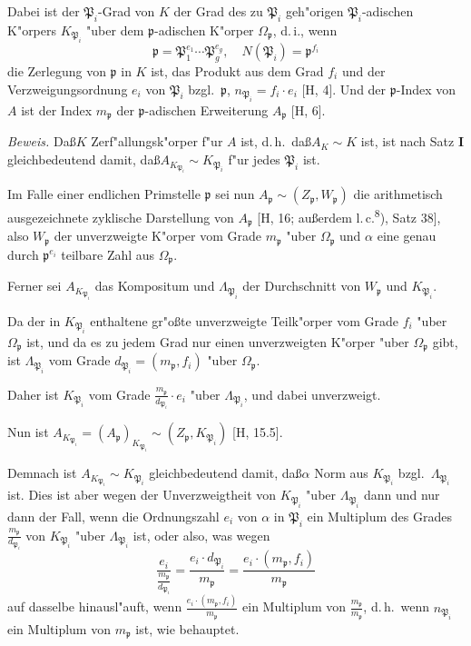 \documentclass[12pt,a4paper]{article}
\theoremstyle{plain}
\begin{document}
Dabei ist der $\mathfrak{P}_i$-Grad von $K$ der Grad des zu $\mathfrak{P}_i$ geh"origen $\mathfrak{P}_i$-adischen K"orpers $K_{\mathfrak{P}_i}$ "uber dem $\mathfrak{p}$-adischen K"orper $\Omega_\mathfrak{p}$, d.\,i., wenn
\[
\mathfrak{p} = \mathfrak{P}_1^{e_1} \cdots \mathfrak{P}_g^{e_g},\quad
N(\mathfrak{P}_i) = \mathfrak{p}^{f_i}
\]
die Zerlegung von $\mathfrak{p}$ in $K$ ist, das Produkt aus dem Grad $f_i$ und der Verzweigungsordnung $e_i$ von $\mathfrak{P}_i$ bzgl.\ $\mathfrak{p}$, $n_{\mathfrak{P}_i} = f_i \cdot e_i$ [H, 4]. Und der $\mathfrak{p}$-Index von $A$ ist der Index $m_\mathfrak{p}$ der $\mathfrak{p}$-adischen Erweiterung $A_\mathfrak{p}$ [H, 6].

\noindent\textit{Beweis.}
Da\ss $K$ Zerf"allungsk"orper f"ur $A$ ist, d.\,h.\ da\ss $A_K \sim K$ ist, ist nach Satz \textbf{I} gleichbedeutend damit, da\ss $A_{K_{\mathfrak{P}_i}} \sim K_{\mathfrak{P}_i}$ f"ur jedes $\mathfrak{P}_i$ ist.

Im Falle einer endlichen Primstelle $\mathfrak{p}$ sei nun $A_\mathfrak{p} \sim (Z_\mathfrak{p}, W_\mathfrak{p})$ die arithmetisch ausgezeichnete zyklische Darstellung von $A_\mathfrak{p}$ [H, 16; au\ss erdem l.\,c.\textsuperscript{8}), Satz 38], also $W_\mathfrak{p}$ der unverzweigte K"orper vom Grade $m_\mathfrak{p}$ "uber $\Omega_\mathfrak{p}$ und $\alpha$ eine genau durch $\mathfrak{p}^{e_i}$ teilbare Zahl aus $\Omega_\mathfrak{p}$.

Ferner sei $A_{K_{\mathfrak{P}_i}}$ das Kompositum und $\Lambda_{\mathfrak{P}_i}$ der Durchschnitt von $W_\mathfrak{p}$ und $K_{\mathfrak{P}_i}$.

Da der in $K_{\mathfrak{P}_i}$ enthaltene gr"o\ss te unverzweigte Teilk"orper vom Grade $f_i$ "uber $\Omega_\mathfrak{p}$ ist, und da es zu jedem Grad nur einen unverzweigten K"orper "uber $\Omega_\mathfrak{p}$ gibt, ist $\Lambda_{\mathfrak{P}_i}$ vom Grade $d_{\mathfrak{P}_i} = (m_\mathfrak{p}, f_i)$ "uber $\Omega_\mathfrak{p}$.

Daher ist $K_{\mathfrak{P}_i}$ vom Grade $\frac{m_\mathfrak{p}}{d_{\mathfrak{P}_i}} \cdot e_i$ "uber $\Lambda_{\mathfrak{P}_i}$, und dabei unverzweigt.

Nun ist $A_{K_{\mathfrak{P}_i}} = (A_\mathfrak{p})_{K_{\mathfrak{P}_i}} \sim (Z_\mathfrak{p}, K_{\mathfrak{P}_i})$ [H, 15.5].

Demnach ist $A_{K_{\mathfrak{P}_i}} \sim K_{\mathfrak{P}_i}$ gleichbedeutend damit, da\ss $\alpha$ Norm aus $K_{\mathfrak{P}_i}$ bzgl.\ $\Lambda_{\mathfrak{P}_i}$ ist. Dies ist aber wegen der Unverzweigtheit von $K_{\mathfrak{P}_i}$ "uber $\Lambda_{\mathfrak{P}_i}$ dann und nur dann der Fall, wenn die Ordnungszahl $e_i$ von $\alpha$ in $\mathfrak{P}_i$ ein Multiplum des Grades $\frac{m_\mathfrak{p}}{d_{\mathfrak{P}_i}}$ von $K_{\mathfrak{P}_i}$ "uber $\Lambda_{\mathfrak{P}_i}$ ist, oder also, was wegen
\[
\frac{e_i}{\frac{m_\mathfrak{p}}{d_{\mathfrak{P}_i}}} = \frac{e_i \cdot d_{\mathfrak{P}_i}}{m_\mathfrak{p}} = \frac{e_i \cdot (m_\mathfrak{p}, f_i)}{m_\mathfrak{p}}
\]
auf dasselbe hinausl"auft, wenn $\frac{e_i \cdot (m_\mathfrak{p}, f_i)}{m_\mathfrak{p}}$ ein Multiplum von $\frac{m_\mathfrak{p}}{m_\mathfrak{p}}$, d.\,h.\ wenn $n_{\mathfrak{P}_i}$ ein Multiplum von $m_\mathfrak{p}$ ist, wie behauptet.
\end{document}
